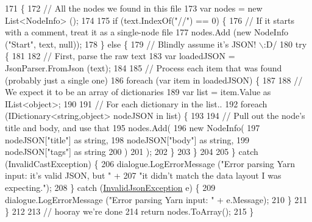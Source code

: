 \begin{DoxyCode}
171         \{
172             \textcolor{comment}{// All the nodes we found in this file}
173             var nodes = \textcolor{keyword}{new} List<NodeInfo> ();
174 
175             \textcolor{keywordflow}{if} (text.IndexOf(\textcolor{stringliteral}{"//"}) == 0) \{
176                 \textcolor{comment}{// If it starts with a comment, treat it as a single-node file}
177                 nodes.Add (\textcolor{keyword}{new} NodeInfo (\textcolor{stringliteral}{"Start"}, text, null));
178             \} \textcolor{keywordflow}{else} \{
179                 \textcolor{comment}{// Blindly assume it's JSON! \(\backslash\):D/}
180                 \textcolor{keywordflow}{try} \{
181 
182                     \textcolor{comment}{// First, parse the raw text}
183                     var loadedJSON = JsonParser.FromJson (text);
184 
185                     \textcolor{comment}{// Process each item that was found (probably just a single one)}
186                     \textcolor{keywordflow}{foreach} (var item \textcolor{keywordflow}{in} loadedJSON) \{
187 
188                         \textcolor{comment}{// We expect it to be an array of dictionaries}
189                         var list = item.Value as IList<object>;
190 
191                         \textcolor{comment}{// For each dictionary in the list..}
192                         \textcolor{keywordflow}{foreach} (IDictionary<string,object> nodeJSON \textcolor{keywordflow}{in} list) \{
193 
194                             \textcolor{comment}{// Pull out the node's title and body, and use that}
195                             nodes.Add(
196                                 \textcolor{keyword}{new} NodeInfo(
197                                     nodeJSON[\textcolor{stringliteral}{"title"}] as \textcolor{keywordtype}{string}, 
198                                     nodeJSON[\textcolor{stringliteral}{"body"}] as \textcolor{keywordtype}{string},
199                                     nodeJSON[\textcolor{stringliteral}{"tags"}] as \textcolor{keywordtype}{string}
200                                 )
201                             );
202                         \}
203                     \}
204 
205                 \} \textcolor{keywordflow}{catch} (InvalidCastException) \{
206                     dialogue.LogErrorMessage (\textcolor{stringliteral}{"Error parsing Yarn input: it's valid JSON, but "} +
207                         \textcolor{stringliteral}{"it didn't match the data layout I was expecting."});
208                 \} \textcolor{keywordflow}{catch} (\hyperlink{a00045}{InvalidJsonException} e) \{
209                     dialogue.LogErrorMessage (\textcolor{stringliteral}{"Error parsing Yarn input: "} + e.Message);
210                 \}
211             \}
212 
213             \textcolor{comment}{// hooray we're done}
214             \textcolor{keywordflow}{return} nodes.ToArray();
215         \}
\end{DoxyCode}

